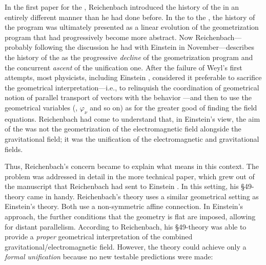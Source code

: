 \documentclass[final]{article}
\newcommand{\PRZL}{\citetitle{Reichenbach1928}\xspace}
\begin{document}
In the first paper for the , Reichenbach introduced the history of the \uft in an entirely different manner than he had done before. In the \Ap to the \PRZL, the history of the \uft program was ultimately presented as a linear evolution of the geometrization program that had progressively become more abstract. Now Reichenbach---probably following the discussion he had with Einstein in November---describes the history of the \uft as the progressive \emph{decline} of the geometrization program and the concurrent \emph{ascent} of the unification one. After the failure of Weyl's first attempts, most physicists, including Einstein , considered it preferable to sacrifice the geometrical interpretation---i.e., to relinquish the coordination of geometrical notion of parallel transport of vectors with the behavior \rac---and then to use the geometrical variables (\Gtmn, $\varphi_\nu$ and so on) as  for the greater good of finding the field equations. Reichenbach had come to understand that, in Einstein's view, the aim of the \uftp was not the geometrization of the electromagnetic field alongside the gravitational field; it was the unification of the electromagnetic and gravitational fields. 


Thus, Reichenbach's concern became to explain what  means in this context. The problem was addressed in detail in the more technical paper, which grew out of the manuscript that Reichenbach had sent to Einstein \citep{Reichenbach1929a}.  In this setting, his \S49-theory came in handy. Reichenbach's theory uses a similar geometrical setting as Einstein's theory. Both use a non-symmetric affine connection. In Einstein's approach, the further conditions that the geometry is flat are imposed, allowing for distant parallelism. According to Reichenbach, his \S49-theory was able to provide a \emph{proper} geometrical interpretation of the combined gravitational/electromagnetic field. However, the theory could achieve only a \emph{formal unification} because no new testable predictions were made:
\end{document}
